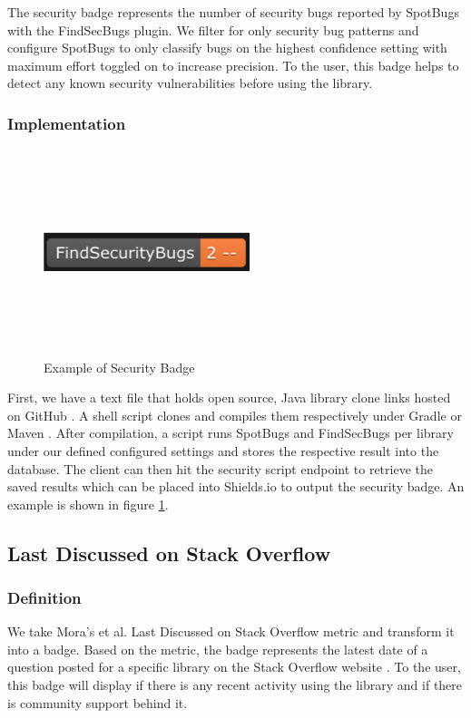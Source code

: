 \documentclass[12pt, letterpaper]{article}
\begin{document}
The security badge represents the number of security bugs reported by SpotBugs \cite{spotbugs} with the FindSecBugs \cite{findsecbugs} plugin.
We filter for only security bug patterns and configure SpotBugs to only classify bugs on the highest confidence setting
with maximum effort toggled on to increase precision. To the user, this badge helps to detect
any known security vulnerabilities before using the library. 

\subsubsection{Implementation}

\begin{figure}[!htb]
    \centerline{
        \includegraphics[width=6cm,height=6cm,keepaspectratio=true]{findsecbugsbadge}
    }
    \caption{
        Example of Security Badge
    }
    \label{findsecbugsbadge}
\end{figure}

First, we have a text file that holds open source, Java library clone links hosted on GitHub \cite{github}.
A shell script clones and compiles them respectively under Gradle \cite{gradle} or Maven \cite{maven}.
After compilation, a script runs SpotBugs and FindSecBugs per library under our defined configured settings
and stores the respective result
into the database. The client can then hit the security script endpoint to retrieve the saved results which
can be placed into Shields.io \cite{shields} to output the security badge. 
An example is shown in figure \ref{findsecbugsbadge}. 


\subsection{Last Discussed on Stack Overflow}
\subsubsection{Definition}
We take Mora's et al. \cite{metrics} Last Discussed on Stack Overflow metric and transform it 
into a badge. Based on the metric, the badge represents the latest date of a question posted for a specific
library on the Stack Overflow website \cite{stackoverflow}.
To the user, this badge will display if there is any recent activity using the library and if there is
community support behind it.  
\end{document}
